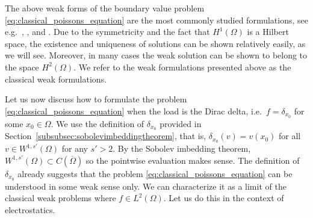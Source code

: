\documentclass[english, 12pt, a4paper, sci, utf8, a-2b, online]{aaltothesis}
\theoremstyle{definition}
\theoremstyle{plain}
\numberwithin{equation}{section}
\begin{document}
The above weak forms of the boundary value problem
\eqref{eq:classical_poissons_equation} are the most commonly studied formulations,
see e.g.\ \cite{evans2010}, \cite{grisvard2011}, \cite{ciarlet2002} and
\cite{braess2007}. Due to the symmetricity and the fact
that $H^1(\Omega)$ is a Hilbert space, the existence and uniqueness of
solutions can be shown relatively easily, as we will see.
Moreover, in many cases the weak solution can be shown to belong to the space
$H^2(\Omega)$. We refer to the weak formulations presented above as the
classical weak formulations.

Let us now discuss how to formulate the problem 
\eqref{eq:classical_poissons_equation}
when the load is the Dirac delta, i.e.\ $f = \delta_{x_0}$ for some $x_0 \in \Omega$.
We use the definition of $\delta_{x_0}$ provided in Section~\ref{subsubsec:sobolevimbeddingtheorem},
that is, $\delta_{x_0}(v) = v(x_0)$ for all $v \in W^{1,s'}(\Omega)$ for any $s' > 2$.
By the Sobolev imbedding theorem, $W^{1,s'}(\Omega) \subset C(\overline{\Omega})$
so the pointwise evaluation makes sense.
The definition of $\delta_{x_0}$ already suggests that
the problem \eqref{eq:classical_poissons_equation} can be understood
in some weak sense only. We can characterize it as a limit of the classical
weak problems where $f \in L^2(\Omega)$.
Let us do this in the context of electrostatics.
\end{document}
